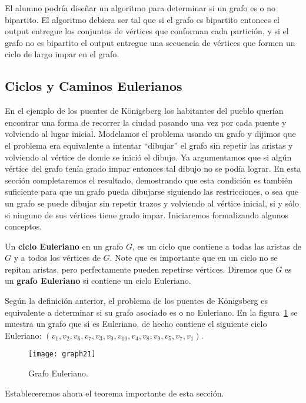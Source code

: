 El alumno podría diseñar un algoritmo para determinar si un grafo es o no bipartito.
El algoritmo debiera ser tal que si el grafo es bipartito entonces el output entregue los conjuntos de vértices que conforman cada partición, y si el grafo no es bipartito el output entregue una secuencia de vértices que formen un ciclo de largo impar en el grafo.

\subsection{Ciclos y Caminos Eulerianos}
En el ejemplo de los puentes de K\"onigsberg los habitantes del pueblo querían encontrar una forma de recorrer la ciudad pasando una vez por cada puente y volviendo al lugar inicial.
Modelamos el problema usando un grafo y dijimos que el problema era equivalente a intentar ``dibujar'' el grafo sin repetir las aristas y volviendo al vértice de donde se inició el dibujo.
Ya argumentamos que si algún vértice del grafo tenía grado impar entonces tal dibujo no se podía lograr.
En esta sección completaremos el resultado, demostrando que esta condición es también suficiente para que un grafo pueda dibujarse siguiendo las restricciones, o sea que un grafo se puede dibujar sin repetir trazos y volviendo al vértice inicial, si y sólo si ninguno de sus vértices tiene grado impar.
Iniciaremos formalizando algunos conceptos.


\begin{definicion}
Un {\bf ciclo Euleriano} en un grafo $G$, es un ciclo que contiene a todas las aristas de $G$ y a todos los vértices de $G$.
Note que es importante que en un ciclo no se repitan aristas, pero perfectamente pueden repetirse vértices.
Diremos que $G$ es un {\bf grafo Euleriano} si contiene un ciclo Euleriano.
\end{definicion}

Según la definición anterior, el problema de los puentes de K\"onigsberg es equivalente a determinar si su grafo asociado es o no Euleriano.
En la figura~\ref{fig:graph21} se muestra un grafo que si es Euleriano, de hecho contiene el siguiente ciclo Euleriano: $(v_1,v_2,v_6,v_7,v_3,v_9,v_{10},v_4,v_8,v_9,v_5,v_7,v_1)$.

\begin{figure}[h!]
\centering
\texttt{[image: graph21]}
\caption{Grafo Euleriano.}
\label{fig:graph21}
\end{figure}

Estableceremos ahora el teorema importante de esta sección.


